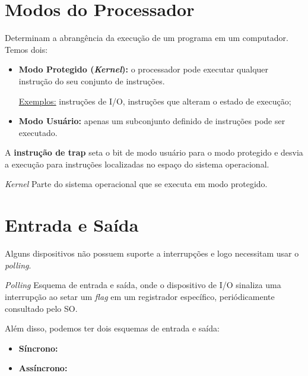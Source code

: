 \section{Modos do Processador}

Determinam a abrangência da execução de um programa em um computador. Temos dois:

\begin{itemize}
  \item \textbf{Modo Protegido (\textit{Kernel}):} o processador pode executar qualquer instrução do seu conjunto de instruções.

  \underline{Exemplos:} instruções de I/O, instruções que alteram o estado de execução; \\

  \item \textbf{Modo Usuário:} apenas um subconjunto definido de instruções pode ser executado.
\end{itemize}

A \textbf{instrução de trap} seta o bit de modo usuário para o modo protegido e desvia a execução para instruções localizadas no espaço do sistema operacional.

\begin{definicao}{\textit{Kernel}}
  Parte do sistema operacional que se executa em modo protegido.
\end{definicao}













\section{Entrada e Saída}
Alguns dispositivos não possuem suporte a interrupções e logo necessitam usar o \textit{polling}.

\begin{definicao}{\textit{Polling}}
  Esquema de entrada e saída, onde o dispositivo de I/O sinaliza uma interrupção ao setar um \textit{flag} em um registrador específico, periódicamente consultado pelo SO.
\end{definicao}


Além disso, podemos ter dois esquemas de entrada e saída:
\begin{itemize}
  \item \textbf{Síncrono:}
  \item \textbf{Assíncrono:}
\end{itemize}

